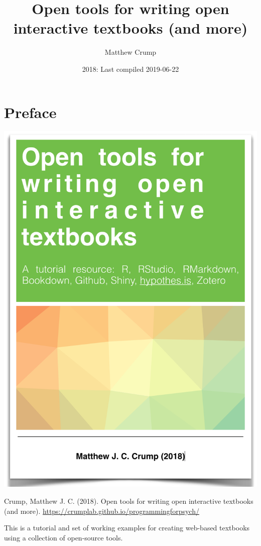 \documentclass[]{book}
\title{Open tools for writing open interactive textbooks (and more)}
\author{Matthew Crump}
\date{2018: Last compiled 2019-06-22}
\begin{document}
\maketitle

{
\setcounter{tocdepth}{1}
\tableofcontents
}
\hypertarget{preface}{%
\chapter*{Preface}\label{preface}}

\begin{center}\includegraphics{OER} \end{center}

Crump, Matthew J. C. (2018). Open tools for writing open interactive textbooks (and more). \url{https://crumplab.github.io/programmingforpsych/}

This is a tutorial and set of working examples for creating web-based textbooks using a collection of open-source tools.
\end{document}
